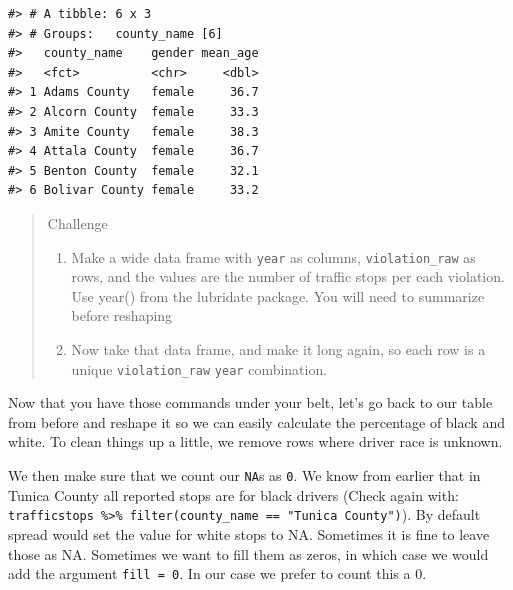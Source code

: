 \documentclass[]{book}
\newenvironment{Shaded}{\begin{snugshade}}{\end{snugshade}}
\newcommand{\KeywordTok}[1]{\textcolor[rgb]{0.13,0.29,0.53}{\textbf{#1}}}
\newcommand{\NormalTok}[1]{#1}
\newcommand{\OperatorTok}[1]{\textcolor[rgb]{0.81,0.36,0.00}{\textbf{#1}}}
\newcommand{\StringTok}[1]{\textcolor[rgb]{0.31,0.60,0.02}{#1}}
\begin{document}
\begin{Shaded}
\end{Shaded}

\begin{verbatim}
#> # A tibble: 6 x 3
#> # Groups:   county_name [6]
#>   county_name    gender mean_age
#>   <fct>          <chr>     <dbl>
#> 1 Adams County   female     36.7
#> 2 Alcorn County  female     33.3
#> 3 Amite County   female     38.3
#> 4 Attala County  female     36.7
#> 5 Benton County  female     32.1
#> 6 Bolivar County female     33.2
\end{verbatim}

\begin{quote}
Challenge

\begin{enumerate}
\def\labelenumi{\arabic{enumi}.}
\item
  Make a wide data frame with \texttt{year} as columns, \texttt{violation\_raw} as rows, and the values are the number of traffic stops per each violation. Use year() from the lubridate package. You will need to summarize before reshaping
\item
  Now take that data frame, and make it long again, so each row is a unique
  \texttt{violation\_raw} \texttt{year} combination.
\end{enumerate}
\end{quote}

Now that you have those commands under your belt, let's go back to our table from before and reshape it so we can easily calculate the percentage of black and white. To clean things up a little, we remove rows where driver race is unknown.

We then make sure that we count our \texttt{NA}s as \texttt{0}. We know from earlier that in Tunica County all reported stops are for black drivers (Check again with: \texttt{trafficstops\ \%\textgreater{}\%\ filter(county\_name\ ==\ "Tunica\ County")}). By default spread would set the value for white stops to NA. Sometimes it is fine to leave those as NA. Sometimes we want to fill them as zeros, in which case we would add the argument \texttt{fill\ =\ 0}. In our case we prefer to count this a 0.
\end{document}
